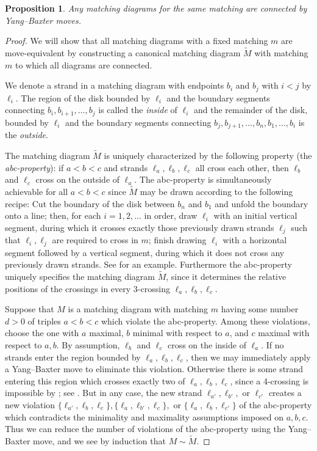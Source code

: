 \documentclass{amsart}
\newtheorem{proposition}[theorem]{Proposition}
\theoremstyle{definition}
\theoremstyle{remark}
\numberwithin{equation}{section}
\begin{document}
\begin{proposition}
\label{prop:pm-diagrams-connected-under-Yang--Baxter}
Any matching diagrams for the same matching are connected by Yang--Baxter moves.
\end{proposition}
\begin{proof}
We will show that all matching diagrams with a fixed matching $m$ are move-equivalent by constructing a canonical matching diagram $\tilde{M}$ with matching $m$ to which all diagrams are connected.

We denote a strand in a matching diagram with endpoints $b_i$ and $b_j$ with $i<j$ by $\ell_i$. The region of the disk bounded by $\ell_i$ and the boundary segments connecting $b_i,b_{i+1},\ldots,b_j$ is called the \emph{inside} of $\ell_i$ and the remainder of the disk, bounded by $\ell_i$ and the boundary segments connecting $b_j, b_{j+1},\ldots,b_n, b_1,\ldots,b_i$ is the \emph{outside}. 

The matching diagram $\tilde{M}$ is uniquely characterized by the following property (the \emph{abc-property}): if $a<b<c$ and strands $\ell_a, \ell_b, \ell_c$ all cross each other, then $\ell_b$ and $\ell_c$ cross on the outside of $\ell_a$. The abc-property is simultaneously achievable for all $a<b<c$ since $\tilde{M}$ may be drawn according to the following recipe: Cut the boundary of the disk between $b_n$ and $b_1$ and unfold the boundary onto a line; then, for each $i=1,2,\ldots$ in order, draw $\ell_i$ with an initial vertical segment, during which it crosses exactly those previously drawn strands $\ell_j$ such that $\ell_i,\ell_j$ are required to cross in $m$; finish drawing $\ell_i$ with a horizontal segment followed by a vertical segment, during which it does not cross any previously drawn strands. See  for an example. Furthermore the abc-property uniquely specifies the matching diagram $\tilde{M}$, since it determines the relative positions of the crossings in every 3-crossing $\ell_a,\ell_b,\ell_c$.

Suppose that $M$ is a matching diagram with matching $m$ having some number $d>0$ of triples $a<b<c$ which violate the abc-property. Among these violations, choose the one with $a$ maximal, $b$ minimal with respect to $a$, and $c$ maximal with respect to $a,b$. By assumption, $\ell_b$ and $\ell_c$ cross on the inside of $\ell_a$. If no strands enter the region bounded by $\ell_a,\ell_b,\ell_c$, then we may immediately apply a Yang--Baxter move to eliminate this violation. Otherwise there is some strand entering this region which crosses exactly two of $\ell_a,\ell_b,\ell_c$, since a 4-crossing is impossible by ; see . But in any case, the new strand $\ell_{a'},\ell_{b'},$ or $\ell_{c'}$ creates a new violation $\{\ell_{a'},\ell_b,\ell_c\}, \{\ell_{a},\ell_{b'},\ell_c\},$ or $\{\ell_{a},\ell_b,\ell_{c'}\}$ of the abc-property which contradicts the minimality and maximality assumptions imposed on $a,b,c$. Thus we can reduce the number of violations of the abc-property using the Yang--Baxter move, and we see by induction that $M \sim \tilde{M}$.
\end{proof}
\end{document}
